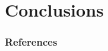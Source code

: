 \documentclass[xetex,aspectratio=169,xcolor,professionalfonts,hyperref]{beamer}
\begin{document}





\section{Conclusions}

\begin{frame}[t,allowframebreaks]
    \frametitle{References}
    \printbibliography
\end{frame}
\end{document}
